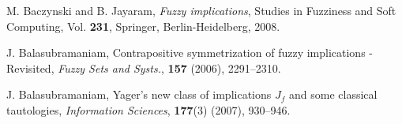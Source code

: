 \documentclass[12pt]{article}
\theoremstyle{plain}
\theoremstyle{remark}
\theoremstyle{definition}
\theoremstyle{proposition}
\begin{document}
\begin{thebibliography}{8}
{\small




 M. Baczynski and B. Jayaram, \emph{Fuzzy implications}, Studies in
Fuzziness and Soft Computing, Vol. {\bf231}, Springer, Berlin-Heidelberg, 2008.


%
 J. Balasubramaniam, Contrapositive symmetrization of fuzzy implications - Revisited,
\emph{Fuzzy Sets and Systs.}, {\bf 157} (2006), 2291--2310.


J. Balasubramaniam,  Yager's new class of implications ${J}_f$ and some classical
  tautologies, \emph{Information Sciences}, \textbf{177}(3) (2007), 930--946.

}
\end{thebibliography}
\end{document}
